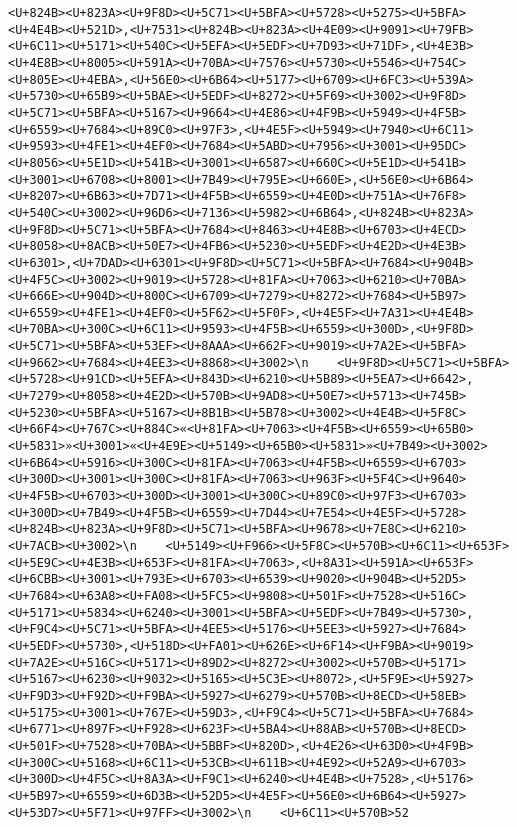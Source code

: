 \documentclass[
]{article}
\begin{document}
\begin{verbatim}
<U+824B><U+823A><U+9F8D><U+5C71><U+5BFA><U+5728><U+5275><U+5BFA><U+4E4B><U+521D>,<U+7531><U+824B><U+823A><U+4E09><U+9091><U+79FB><U+6C11><U+5171><U+540C><U+5EFA><U+5EDF><U+7D93><U+71DF>,<U+4E3B><U+4E8B><U+8005><U+591A><U+70BA><U+7576><U+5730><U+5546><U+754C><U+805E><U+4EBA>,<U+56E0><U+6B64><U+5177><U+6709><U+6FC3><U+539A><U+5730><U+65B9><U+5BAE><U+5EDF><U+8272><U+5F69><U+3002><U+9F8D><U+5C71><U+5BFA><U+5167><U+9664><U+4E86><U+4F9B><U+5949><U+4F5B><U+6559><U+7684><U+89C0><U+97F3>,<U+4E5F><U+5949><U+7940><U+6C11><U+9593><U+4FE1><U+4EF0><U+7684><U+5ABD><U+7956><U+3001><U+95DC><U+8056><U+5E1D><U+541B><U+3001><U+6587><U+660C><U+5E1D><U+541B><U+3001><U+6708><U+8001><U+7B49><U+795E><U+660E>,<U+56E0><U+6B64><U+8207><U+6B63><U+7D71><U+4F5B><U+6559><U+4E0D><U+751A><U+76F8><U+540C><U+3002><U+96D6><U+7136><U+5982><U+6B64>,<U+824B><U+823A><U+9F8D><U+5C71><U+5BFA><U+7684><U+8463><U+4E8B><U+6703><U+4ECD><U+8058><U+8ACB><U+50E7><U+4FB6><U+5230><U+5EDF><U+4E2D><U+4E3B><U+6301>,<U+7DAD><U+6301><U+9F8D><U+5C71><U+5BFA><U+7684><U+904B><U+4F5C><U+3002><U+9019><U+5728><U+81FA><U+7063><U+6210><U+70BA><U+666E><U+904D><U+800C><U+6709><U+7279><U+8272><U+7684><U+5B97><U+6559><U+4FE1><U+4EF0><U+5F62><U+5F0F>,<U+4E5F><U+7A31><U+4E4B><U+70BA><U+300C><U+6C11><U+9593><U+4F5B><U+6559><U+300D>,<U+9F8D><U+5C71><U+5BFA><U+53EF><U+8AAA><U+662F><U+9019><U+7A2E><U+5BFA><U+9662><U+7684><U+4EE3><U+8868><U+3002>\n    <U+9F8D><U+5C71><U+5BFA><U+5728><U+91CD><U+5EFA><U+843D><U+6210><U+5B89><U+5EA7><U+6642>,<U+7279><U+8058><U+4E2D><U+570B><U+9AD8><U+50E7><U+5713><U+745B><U+5230><U+5BFA><U+5167><U+8B1B><U+5B78><U+3002><U+4E4B><U+5F8C><U+66F4><U+767C><U+884C>«<U+81FA><U+7063><U+4F5B><U+6559><U+65B0><U+5831>»<U+3001>«<U+4E9E><U+5149><U+65B0><U+5831>»<U+7B49><U+3002><U+6B64><U+5916><U+300C><U+81FA><U+7063><U+4F5B><U+6559><U+6703><U+300D><U+3001><U+300C><U+81FA><U+7063><U+963F><U+5F4C><U+9640><U+4F5B><U+6703><U+300D><U+3001><U+300C><U+89C0><U+97F3><U+6703><U+300D><U+7B49><U+4F5B><U+6559><U+7D44><U+7E54><U+4E5F><U+5728><U+824B><U+823A><U+9F8D><U+5C71><U+5BFA><U+9678><U+7E8C><U+6210><U+7ACB><U+3002>\n    <U+5149><U+F966><U+5F8C><U+570B><U+6C11><U+653F><U+5E9C><U+4E3B><U+653F><U+81FA><U+7063>,<U+8A31><U+591A><U+653F><U+6CBB><U+3001><U+793E><U+6703><U+6539><U+9020><U+904B><U+52D5><U+7684><U+63A8><U+FA08><U+5FC5><U+9808><U+501F><U+7528><U+516C><U+5171><U+5834><U+6240><U+3001><U+5BFA><U+5EDF><U+7B49><U+5730>,<U+F9C4><U+5C71><U+5BFA><U+4EE5><U+5176><U+5EE3><U+5927><U+7684><U+5EDF><U+5730>,<U+518D><U+FA01><U+626E><U+6F14><U+F9BA><U+9019><U+7A2E><U+516C><U+5171><U+89D2><U+8272><U+3002><U+570B><U+5171><U+5167><U+6230><U+9032><U+5165><U+5C3E><U+8072>,<U+5F9E><U+5927><U+F9D3><U+F92D><U+F9BA><U+5927><U+6279><U+570B><U+8ECD><U+58EB><U+5175><U+3001><U+767E><U+59D3>,<U+F9C4><U+5C71><U+5BFA><U+7684><U+6771><U+897F><U+F928><U+623F><U+5BA4><U+88AB><U+570B><U+8ECD><U+501F><U+7528><U+70BA><U+5BBF><U+820D>,<U+4E26><U+63D0><U+4F9B><U+300C><U+5168><U+6C11><U+53CB><U+611B><U+4E92><U+52A9><U+6703><U+300D><U+4F5C><U+8A3A><U+F9C1><U+6240><U+4E4B><U+7528>,<U+5176><U+5B97><U+6559><U+6D3B><U+52D5><U+4E5F><U+56E0><U+6B64><U+5927><U+53D7><U+5F71><U+97FF><U+3002>\n    <U+6C11><U+570B>52 
\end{verbatim}
\end{document}
